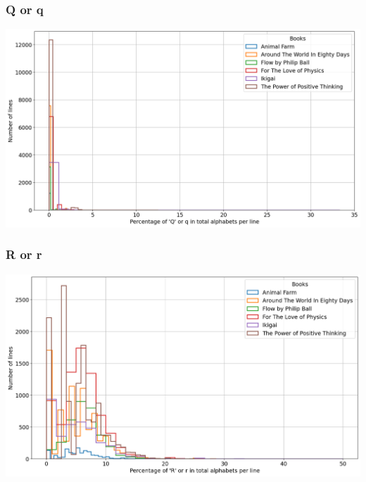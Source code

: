 \begin{frame}
    \frametitle{Q or q}
    \begin{center}
        \hspace*{-5ex}
        \includegraphics[scale=0.35]{../01_programFiles/histograms/q.png}\hspace{10ex}
    \end{center}
\end{frame}

\begin{frame}
    \frametitle{R or r}
    \begin{center}
        \hspace*{-5ex}
        \includegraphics[scale=0.35]{../01_programFiles/histograms/r.png}\hspace{10ex}
    \end{center}
\end{frame}

